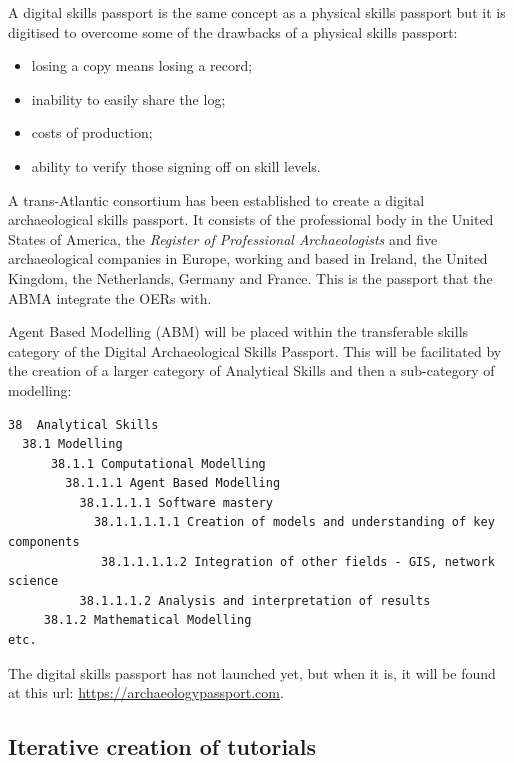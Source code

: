 \documentclass[
]{article}
\begin{document}
A digital skills passport is the same concept as a physical skills passport but it is digitised to overcome some of the drawbacks of a physical skills passport:

\begin{itemize}
\item
  losing a copy means losing a record;
\item
  inability to easily share the log;
\item
  costs of production;
\item
  ability to verify those signing off on skill levels.~
\end{itemize}

A trans-Atlantic consortium has been established to create a digital archaeological skills passport. It consists of the professional body in the United States of America, the \emph{Register of Professional Archaeologists} and five archaeological companies in Europe, working and based in Ireland, the United Kingdom, the Netherlands, Germany and France. This is the passport that the ABMA integrate the OERs with.~

Agent Based Modelling (ABM) will be placed within the transferable skills category of the Digital Archaeological Skills Passport. This will be facilitated by the creation of a larger category of Analytical Skills and then a sub-category of modelling:

\begin{verbatim}
38  Analytical Skills
  38.1 Modelling
      38.1.1 Computational Modelling
        38.1.1.1 Agent Based Modelling
          38.1.1.1.1 Software mastery
            38.1.1.1.1.1 Creation of models and understanding of key components
             38.1.1.1.1.2 Integration of other fields - GIS, network science
          38.1.1.1.2 Analysis and interpretation of results
     38.1.2 Mathematical Modelling
etc.
\end{verbatim}

The digital skills passport has not launched yet, but when it is, it will be found at this url: \url{https://archaeologypassport.com}.

\hypertarget{iterative-creation-of-tutorials}{%
\subsection{Iterative creation of tutorials}\label{iterative-creation-of-tutorials}}
\end{document}
